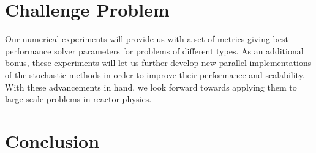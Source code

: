\section{Challenge Problem}
\label{sec:challenge_problem}
Our numerical experiments will provide us with a set of metrics giving
best-performance solver parameters for problems of different types. As
an additional bonus, these experiments will let us further develop new
parallel implementations of the stochastic methods in order to improve
their performance and scalability. With these advancements in hand, we
look forward towards applying them to large-scale problems in reactor
physics. 

\section{Conclusion}
\label{sec:conclusion}
